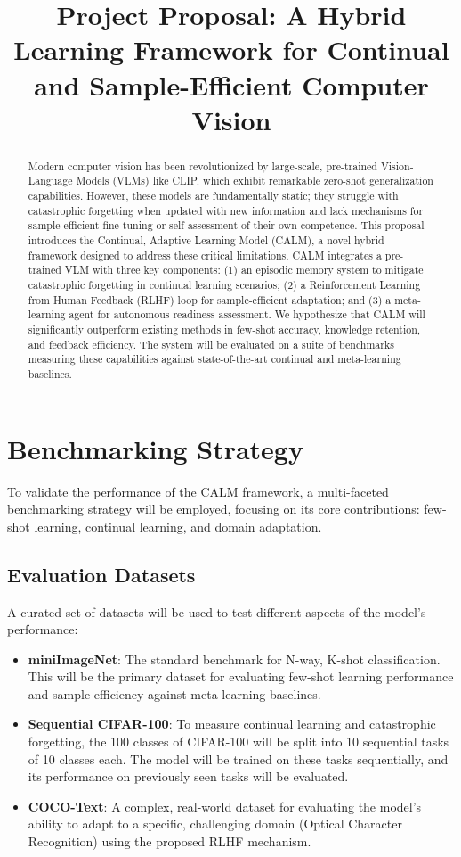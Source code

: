 \documentclass[12pt]{article}
\begin{document}
\title{Project Proposal: A Hybrid Learning Framework for Continual and Sample-Efficient Computer Vision}
\author{}
\date{}
\maketitle

\begin{abstract}
Modern computer vision has been revolutionized by large-scale, pre-trained Vision-Language Models (VLMs) like CLIP, which exhibit remarkable zero-shot generalization capabilities. However, these models are fundamentally static; they struggle with catastrophic forgetting when updated with new information and lack mechanisms for sample-efficient fine-tuning or self-assessment of their own competence. This proposal introduces the Continual, Adaptive Learning Model (CALM), a novel hybrid framework designed to address these critical limitations. CALM integrates a pre-trained VLM with three key components: (1) an episodic memory system to mitigate catastrophic forgetting in continual learning scenarios; (2) a Reinforcement Learning from Human Feedback (RLHF) loop for sample-efficient adaptation; and (3) a meta-learning agent for autonomous readiness assessment. We hypothesize that CALM will significantly outperform existing methods in few-shot accuracy, knowledge retention, and feedback efficiency. The system will be evaluated on a suite of benchmarks measuring these capabilities against state-of-the-art continual and meta-learning baselines.
\end{abstract}

\section{Benchmarking Strategy}
To validate the performance of the CALM framework, a multi-faceted benchmarking strategy will be employed, focusing on its core contributions: few-shot learning, continual learning, and domain adaptation.

\subsection{Evaluation Datasets}
A curated set of datasets will be used to test different aspects of the model's performance:
\begin{itemize}
    \item \textbf{miniImageNet}: The standard benchmark for N-way, K-shot classification. This will be the primary dataset for evaluating few-shot learning performance and sample efficiency against meta-learning baselines.
    \item \textbf{Sequential CIFAR-100}: To measure continual learning and catastrophic forgetting, the 100 classes of CIFAR-100 will be split into 10 sequential tasks of 10 classes each. The model will be trained on these tasks sequentially, and its performance on previously seen tasks will be evaluated.
    \item \textbf{COCO-Text}: A complex, real-world dataset for evaluating the model's ability to adapt to a specific, challenging domain (Optical Character Recognition) using the proposed RLHF mechanism.
\end{itemize}
\end{document}
